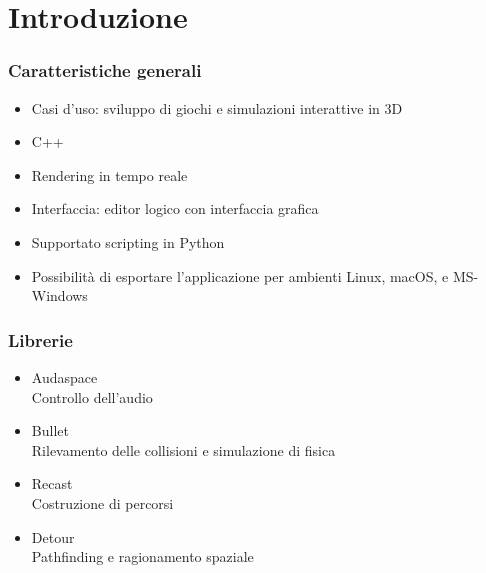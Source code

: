 \documentclass{beamer}
\begin{document}
	\section{Introduzione}
		\begin{frame}
			\frametitle{Caratteristiche generali}
			\begin{itemize}
				\item Casi d'uso: sviluppo di giochi e simulazioni interattive in 3D 
				\item C++
				\item Rendering in tempo reale
				\item Interfaccia: editor logico con interfaccia grafica 
				\item Supportato scripting in Python
				\item Possibilità di esportare l'applicazione per ambienti Linux, macOS, e MS-Windows
			\end{itemize}
		\end{frame}
		\begin{frame}
			\frametitle{Librerie}
			\begin{itemize}
				\item Audaspace \\ {\footnotesize\hspace{1em} Controllo dell'audio}
				\item Bullet \\ {\footnotesize\hspace{1em} Rilevamento delle collisioni e simulazione di fisica} 
				\item Recast \\ {\footnotesize\hspace{1em} Costruzione di percorsi}
				\item Detour \\ {\footnotesize\hspace{1em} Pathfinding e ragionamento spaziale}
			\end{itemize}
		\end{frame}
\end{document}
